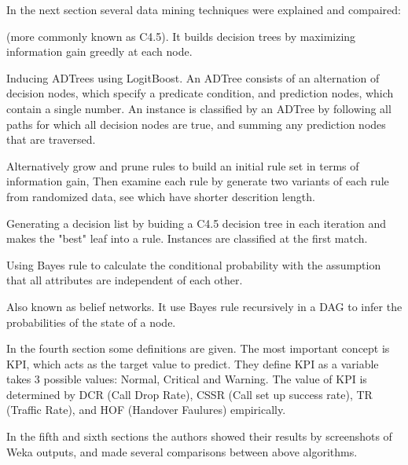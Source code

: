\documentclass{manuscript}
\begin{document}
    In the next section several data mining techniques were explained and compaired:
    \begin{description}
        \item[J48 tree] (more commonly known as C4.5). It builds decision trees by maximizing information gain greedly at
                        each node.\cite{quinlan_c4.5:_1993}
        \item[LAD tree] Inducing ADTrees using LogitBoost. An ADTree consists of an alternation of decision nodes, which
                        specify a predicate condition, and prediction nodes, which contain a single number. An instance
                        is classified by an ADTree by following all paths for which all decision nodes are true, and
                        summing any prediction nodes that are traversed.\cite{holmes_multiclass_2002}
        \item[JRip] Alternatively grow and prune rules to build an initial rule set in terms of information gain, Then
                    examine each rule by generate two variants of each rule from randomized data, see which have shorter
                    descrition length.\cite{cohen_fast_1995}
        \item[PART] Generating a decision list by buiding a C4.5 decision tree in each iteration and makes the "best" leaf
                    into a rule. Instances are classified at the first match.\cite{frank_generating_1998}
        \item[Naïve Bayes] Using Bayes rule to calculate the conditional probability with the assumption that all
                           attributes are independent of each other.\cite{john_estimating_1995}
        \item[Bayesnet] Also known as belief networks. It use Bayes rule recursively in a DAG to infer the probabilities
                        of the state of a node.\cite{barco_comparison_2006}
    \end{description}

    In the fourth section some definitions are given. The most important concept is KPI, which acts as the target value
    to predict. They define KPI as a variable takes 3 possible values: Normal, Critical and Warning. The value of KPI is
    determined by DCR (Call Drop Rate), CSSR (Call set up success rate), TR (Traffic Rate), and HOF (Handover Faulures)
    empirically.

    In the fifth and sixth sections the authors showed their results by screenshots of Weka outputs, and made several
    comparisons between above algorithms.
\end{document}
